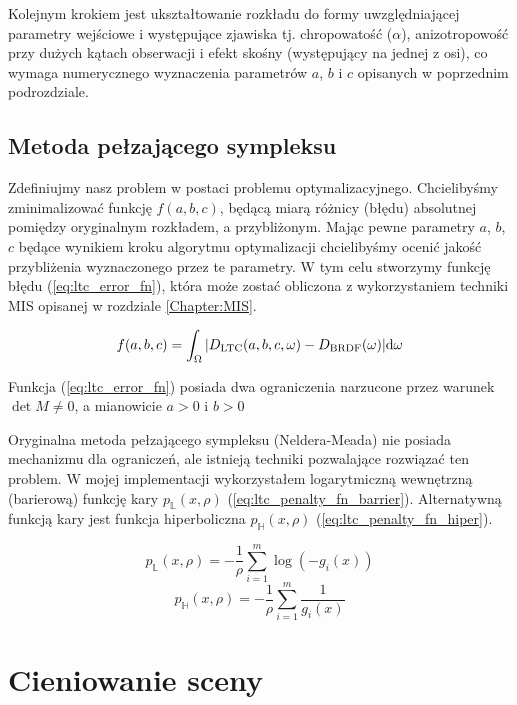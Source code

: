\documentclass[../main.tex]{subfiles}
\begin{document}
Kolejnym krokiem jest ukształtowanie rozkładu do formy uwzględniającej parametry wejściowe i występujące zjawiska tj. chropowatość ($\alpha$), anizotropowość przy dużych kątach obserwacji i efekt skośny (występujący na jednej z osi), co wymaga numerycznego wyznaczenia parametrów $a$, $b$ i $c$ opisanych w poprzednim podrozdziale.

\subsection{Metoda pełzającego sympleksu}

Zdefiniujmy nasz problem w postaci problemu optymalizacyjnego. Chcielibyśmy zminimalizować funkcję $f(a,b,c)$, będącą miarą różnicy (błędu) absolutnej pomiędzy oryginalnym rozkładem, a przybliżonym. Mając pewne parametry $a$, $b$, $c$ będące wynikiem kroku algorytmu optymalizacji chcielibyśmy ocenić jakość przybliżenia wyznaczonego przez te parametry. W tym celu stworzymy funkcję błędu (\ref{eq:ltc_error_fn}), która może zostać obliczona z wykorzystaniem techniki MIS opisanej w rozdziale \ref{Chapter:MIS}.

\begin{equation}
f(a,b,c) =
\int_{\Omega} {
    \abs{
        {D_{\text{LTC}}(a, b, c, \omega) - D_{\text{BRDF}}(\omega)}
    }
} \dd \omega
\label{eq:ltc_error_fn}
\end{equation}

Funkcja (\ref{eq:ltc_error_fn}) posiada dwa ograniczenia narzucone przez warunek $\det M \neq 0$, a mianowicie $a > 0$ i $b > 0$

Oryginalna metoda pełzającego sympleksu (Neldera-Meada) \cite{NelderMead65} nie posiada mechanizmu dla ograniczeń, ale istnieją techniki pozwalające rozwiązać ten problem. W mojej implementacji wykorzystałem logarytmiczną wewnętrzną (barierową) funkcję kary $p_{\mathbb{L}}(x, \rho)$ (\ref{eq:ltc_penalty_fn_barrier}). Alternatywną funkcją kary jest funkcja hiperboliczna $p_{\mathbb{H}}(x, \rho)$ (\ref{eq:ltc_penalty_fn_hiper}).

\begin{equation}
  p_{\mathbb{L}}(x, \rho) = - \frac{1}{\rho} \sum_{i=1}^{m} \log(-g_i(x))
\label{eq:ltc_penalty_fn_barrier}
\end{equation}
\begin{equation}
  p_{\mathbb{H}}(x, \rho) =
    - \frac{1}{\rho} \sum_{i=1}^{m} \frac{1}{g_i(x)}
\label{eq:ltc_penalty_fn_hiper}
\end{equation}


\section{Cieniowanie sceny}
\end{document}
